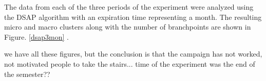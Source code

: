    

The data from each of the three periods of the experiment were analyzed using the DSAP algorithm with an expiration time representing a month. The resulting micro and macro clusters along with the number of branchpoints are shown in Figure. \ref{dsap3mon} .

we have all these figures, but the conclusion is that the campaign has not worked, not motivated people to take the stairs... time of the experiment was the end of the semester??

